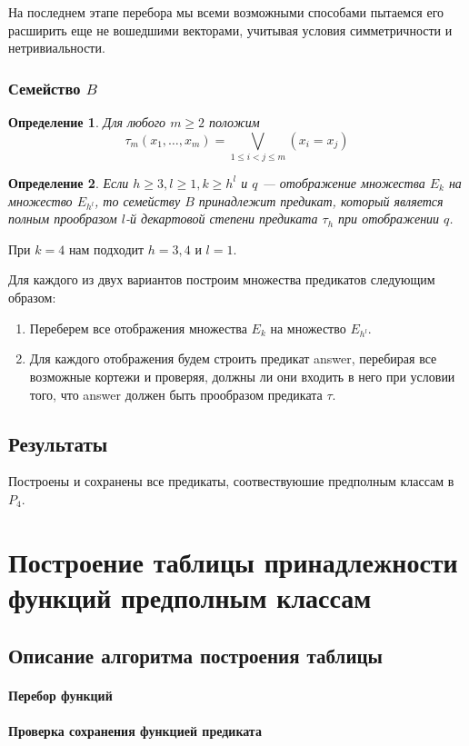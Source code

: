 \documentclass[a4paper,14pt]{extreport}
\newtheorem{opr}{Определение}
\begin{document}
На последнем этапе перебора мы  всеми возможными способами пытаемся его расширить еще не вошедшими векторами, учитывая условия симметричности и нетривиальности.

\subsection{Семейство $B$}
\begin{opr}
Для любого $m \geqslant 2$ положим
$$ \tau_m(x_1, \ldots, x_m) = \bigvee_{1\leqslant i < j \leqslant m}(x_i=x_j) $$
\end{opr}
\begin{opr}
Если $h \geqslant 3, l \geqslant 1, k \geqslant h^l$ и $q$ — отображение множества $E_k$ на  множество $E_{h^l}$, то семейству $B$ принадлежит предикат, который является полным прообразом $l$-й декартовой степени предиката $\tau_h$ при отображении $q$.
\end{opr}
При $k=4$ нам подходит $h=3,4$ и $l=1$.

Для каждого из двух вариантов построим множества предикатов следующим образом:
\begin{enumerate}
\item Переберем все отображения множества $E_k$ на  множество $E_{h^l}$.
\item Для каждого отображения будем строить предикат answer, перебирая все возможные кортежи и проверяя, должны ли они входить в него при условии того, что answer должен быть прообразом предиката $\tau$.
\end{enumerate} 

\section{Результаты}
Построены и сохранены все предикаты, соотвествуюшие предполным классам в $P_4$.  


\newpage
\chapter{Построение таблицы принадлежности функций предполным классам}
\section{Описание алгоритма построения таблицы}
\subsubsection{Перебор функций}
\subsubsection{Проверка сохранения функцией предиката}
\end{document}
